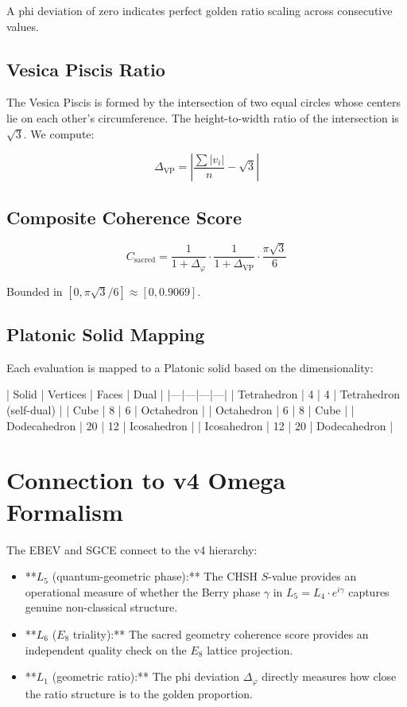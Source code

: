 \documentclass[11pt]{article}
\theoremstyle{plain}
\begin{document}
A phi deviation of zero indicates perfect golden ratio scaling across consecutive values.

\subsection{Vesica Piscis Ratio}

The Vesica Piscis is formed by the intersection of two equal circles whose centers lie on each other's circumference. The height-to-width ratio of the intersection is \( \sqrt{3} \). We compute:

\begin{equation}
\Delta_{\text{VP}} = \left| \frac{\sum |v_i|}{n} - \sqrt{3} \right|
\end{equation}

\subsection{Composite Coherence Score}

\begin{equation}
C_{\text{sacred}} = \frac{1}{1 + \Delta_\varphi} \cdot \frac{1}{1 + \Delta_{\text{VP}}} \cdot \frac{\pi\sqrt{3}}{6}
\end{equation}

Bounded in \( [0, \pi\sqrt{3}/6] \approx [0, 0.9069] \).

\subsection{Platonic Solid Mapping}

Each evaluation is mapped to a Platonic solid based on the dimensionality:

| Solid | Vertices | Faces | Dual |
|—|—|—|—|
| Tetrahedron | 4 | 4 | Tetrahedron (self-dual) |
| Cube | 8 | 6 | Octahedron |
| Octahedron | 6 | 8 | Cube |
| Dodecahedron | 20 | 12 | Icosahedron |
| Icosahedron | 12 | 20 | Dodecahedron |


\section{Connection to v4 Omega Formalism}

The EBEV and SGCE connect to the v4 hierarchy:

\begin{itemize}
  \item **\( L_5 \) (quantum-geometric phase):** The CHSH \( S \)-value provides an operational measure of whether the Berry phase \( \gamma \) in \( L_5 = L_4 \cdot e^{i\gamma} \) captures genuine non-classical structure.
  \item **\( L_6 \) (\( E_8 \) triality):** The sacred geometry coherence score provides an independent quality check on the \( E_8 \) lattice projection.
  \item **\( L_1 \) (geometric ratio):** The phi deviation \( \Delta_\varphi \) directly measures how close the ratio structure is to the golden proportion.
\end{itemize}
\end{document}
